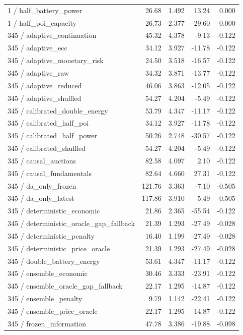 \begin{longtable}{lrrrr}
1 / half\_battery\_power & 26.68 & 1.492 & 13.24 & 0.000\\
1 / half\_poi\_capacity & 26.73 & 2.377 & 29.60 & 0.000\\
345 / adaptive\_continuation & 45.32 & 4.378 & -9.13 & -0.122\\
345 / adaptive\_ecc & 34.12 & 3.927 & -11.78 & -0.122\\
345 / adaptive\_monetary\_risk & 24.50 & 3.518 & -16.57 & -0.122\\
345 / adaptive\_raw & 34.32 & 3.871 & -13.77 & -0.122\\
345 / adaptive\_reduced & 46.06 & 3.863 & -12.05 & -0.122\\
345 / adaptive\_shuffled & 54.27 & 4.204 & -5.49 & -0.122\\
345 / calibrated\_double\_energy & 53.79 & 4.347 & -11.17 & -0.122\\
345 / calibrated\_half\_poi & 34.12 & 3.927 & -11.78 & -0.122\\
345 / calibrated\_half\_power & 50.26 & 2.748 & -30.57 & -0.122\\
345 / calibrated\_shuffled & 54.27 & 4.204 & -5.49 & -0.122\\
345 / causal\_auctions & 82.58 & 4.097 & 2.10 & -0.122\\
345 / causal\_fundamentals & 82.64 & 4.660 & 27.31 & -0.122\\
345 / da\_only\_frozen & 121.76 & 3.363 & -7.10 & -0.505\\
345 / da\_only\_latest & 117.86 & 3.910 & 5.49 & -0.505\\
345 / deterministic\_economic & 21.86 & 2.365 & -55.54 & -0.122\\
345 / deterministic\_oracle\_gap\_fallback & 21.39 & 1.293 & -27.49 & -0.028\\
345 / deterministic\_penalty & 16.40 & 1.199 & -27.49 & -0.028\\
345 / deterministic\_price\_oracle & 21.39 & 1.293 & -27.49 & -0.028\\
345 / double\_battery\_energy & 53.61 & 4.347 & -11.17 & -0.122\\
345 / ensemble\_economic & 30.46 & 3.333 & -23.91 & -0.122\\
345 / ensemble\_oracle\_gap\_fallback & 22.17 & 1.295 & -14.87 & -0.122\\
345 / ensemble\_penalty & 9.79 & 1.142 & -22.41 & -0.122\\
345 / ensemble\_price\_oracle & 22.17 & 1.295 & -14.87 & -0.122\\
345 / frozen\_information & 47.78 & 3.386 & -19.88 & -0.098\\

\end{longtable}
